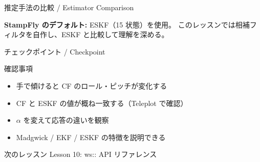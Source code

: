 \documentclass[aspectratio=169, 14pt]{beamer}
\begin{document}
\begin{frame}{推定手法の比較 / Estimator Comparison}
  \centering

  \vspace{0.8em}

  {\footnotesize
    \textbf{StampFly のデフォルト:} ESKF（15 状態）を使用。
    このレッスンでは相補フィルタを自作し、ESKF と比較して理解を深める。
  }
\end{frame}

\begin{frame}{チェックポイント / Checkpoint}
  \begin{alertblock}{確認事項}
    \begin{itemize}
      \item[$\square$] 手で傾けると CF のロール・ピッチが変化する
      \item[$\square$] CF と ESKF の値が概ね一致する（Teleplot で確認）
      \item[$\square$] $\alpha$ を変えて応答の違いを観察
      \item[$\square$] Madgwick / EKF / ESKF の特徴を説明できる
    \end{itemize}
  \end{alertblock}

  \vspace{1em}

  \begin{block}{次のレッスン}
    Lesson 10: ws:: API リファレンス
  \end{block}
\end{frame}
\end{document}
